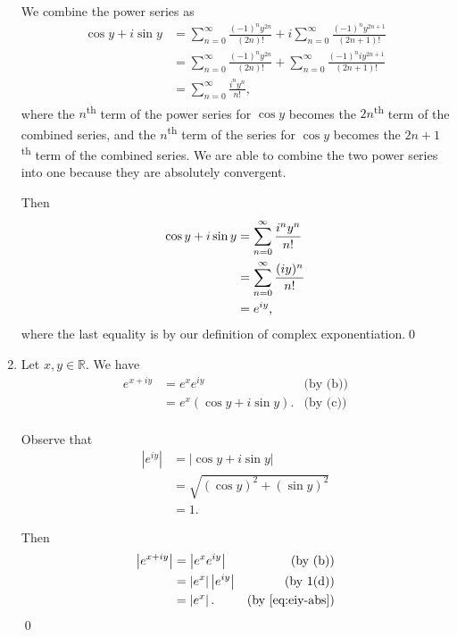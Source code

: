 \documentclass[oneside]{article}
\newcommand\abs[1]{\left|#1\right|}
\newcommand\bbR{\mathbb{R}}
\begin{document}
\begin{enumerate}[label=\textbf{(\alph*)}]
    We combine the power series as \begin{align*}
      \cos y + i\sin y &= \sum_{n=0}^\infty \frac{(-1)^ny^{2n}}{(2n)!}
        + i \sum_{n=0}^\infty \frac{(-1)^ny^{2n+1}}{(2n+1)!} \\
      &= \sum_{n=0}^\infty \frac{(-1)^ny^{2n}}{(2n)!}
        + \sum_{n=0}^\infty \frac{(-1)^niy^{2n+1}}{(2n+1)!} \\
      &= \sum_{n=0}^\infty \frac{i^ny^n}{n!} \text{,}
    \end{align*} where the $n$\textsuperscript{th} term of the power series for
    $\cos y$ becomes the $2n$\textsuperscript{th} term of the combined series,
    and the $n$\textsuperscript{th} term of the series for $\cos y$ becomes the
    $2n + 1$\textsuperscript{th} term of the combined series. We are able to
    combine the two power series into one because they are absolutely
    convergent.

    Then \begin{align*}
      \cos y + i\sin y &= \sum_{n=0}^\infty \frac{i^ny^n}{n!} \\
      &= \sum_{n=0}^\infty \frac{(iy)^n}{n!} \\
      &= e^{iy}\text,
    \end{align*} where the last equality is by our definition of complex
    exponentiation.\qed

    \item Let $x, y \in \bbR$. We have \begin{align*}
      e^{x+iy} &= e^xe^{iy} & \text{(by (b))} \\
      &= e^x(\cos y + i\sin y) \text{.} & \text{(by (c))} \\
    \end{align*}

    Observe that \begin{align}
      \label{eq:eiy-abs}
      \abs{e^{iy}} &= \abs{\cos y + i\sin y} \nonumber\\
      &= \sqrt{(\cos y)^2 + (\sin y)^2} \\
      &= 1 \text{.} \nonumber
    \end{align}

    Then \begin{align*}
      \abs{e^{x + iy}} &= \abs{e^xe^{iy}} & \text{(by (b))} \\
      &= \abs{e^x}\abs{e^{iy}} & \text{(by 1(d))} \\
      &=\abs{e^x}\text{.} & \text{(by \eqref{eq:eiy-abs})}
    \end{align*}\qed


\end{enumerate}
\end{document}
